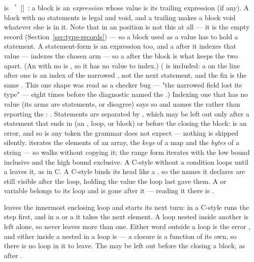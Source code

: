 \noindent {} is \ic{\{}~\(^*\)~[]~\ic{\}}:
a block is an \emph{expression} whose value is its trailing expression
(if any). A block with no statements is legal and void, and a trailing
\ic{;} makes a block void whatever else is in it. Note that \ic{\{\}}
in an  position is not this at all --- it is the empty record
(Section~\ref{sec:type-records}) --- so a block used as a value
has to hold a statement. A statement-form  is an expression too, and a
\ic{[} after it indexes that value --- 
indexes the chosen arm --- so a \ic{;} after the block is what keeps the two
apart. (An  with no  is , so it has no value to index.)
( is included: a \ic{[} on the line after one is an index of the
narrowed , not the next statement, and the fix is the same \ic{;}.
This one shape was read as a checker bug --- "the narrowed field lost its
type" --- eight times before the diagnostic named the \ic{;}.)
Indexing one that has no value (its arms are statements, or disagree) says
so and names the \ic{;} rather than reporting the \ic{[}: . Statements are separated by \ic{;}, which may be
left out only after a statement that ends in \ic{\}} (an ,
loop,  or block) or before the \ic{\}} closing the block:
 is an error, and so is any token the grammar does not
expect --- nothing is skipped silently.  iterates
the elements of an array, the \emph{keys} of a map and the \emph{bytes}
of a string --- so  walks 
without copying it; the  range form iterates 
with the low bound inclusive and the high bound exclusive. A C-style
 without a condition loops until a  leaves it, as in
C. A C-style  binds its head like a , so the names it
declares are still visible after the loop, holding the value the loop
last gave them. A  or  variable
belongs to its loop and is gone after it --- reading it there is
.

\noindent {} leaves the innermost enclosing loop and
 starts its next turn:  in a C-style
 runs the step first, and in a  or a
 it takes the next element. A loop nested inside
another is left alone, so  never leaves more than one. Either
word outside a loop is the error , and
either inside a  nested in a loop is  --- a closure is a function of its own, so there is
no loop in it to leave. The \ic{;} may be left out before the
\ic{\{\}} closing a block, as after .

